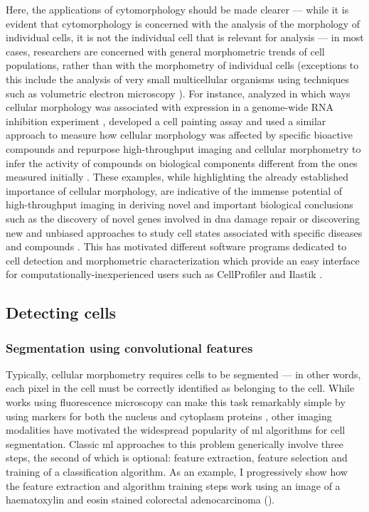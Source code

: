 Here, the applications of cytomorphology should be made clearer --- while it is evident that cytomorphology is concerned with the analysis of the morphology of individual cells, it is not the individual cell that is relevant for analysis --- in most cases, researchers are concerned with general morphometric trends of cell populations, rather than with the morphometry of individual cells (exceptions to this include the analysis of very small multicellular organisms using techniques such as volumetric electron microscopy \cite{Vergara2021-nx,Witvliet2021-gv}). For instance,  analyzed in which ways cellular morphology was associated with expression in a genome-wide RNA inhibition experiment \cite{Fuchs2010-pk},  developed a cell painting assay and used a similar approach to measure how cellular morphology was affected by specific bioactive compounds \cite{Gustafsdottir2013-ul} and  repurpose high-throughput imaging and cellular morphometry to infer the activity of compounds on biological components different from the ones measured initially \cite{Simm2018-nh}. These examples, while highlighting the already established importance of cellular morphology, are indicative of the immense potential of high-throughput imaging in deriving novel and important biological conclusions such as the discovery of novel genes involved in \ac{dna} damage repair \cite{Fuchs2010-pk} or discovering new and unbiased approaches to study cell states associated with specific diseases and compounds \cite{Gustafsdottir2013-ul}. This has motivated different software programs dedicated to cell detection and morphometric characterization which provide an easy interface for computationally-inexperienced users such as CellProfiler \cite{Carpenter2006-hy} and Ilastik \cite{Sommer2011-ds}.

\subsection{Detecting cells}

\subsubsection{Segmentation using convolutional features}

Typically, cellular morphometry requires cells to be segmented --- in other words, each pixel in the cell must be correctly identified as belonging to the cell. While works using fluorescence microscopy can make this task remarkably simple by using markers for both the nucleus and cytoplasm proteins \cite{Fuchs2010-pk,Gustafsdottir2013-ul}, other imaging modalities have motivated the widespread popularity of \ac{ml} algorithms for cell segmentation. Classic \ac{ml} approaches to this problem generically involve three steps, the second of which is optional: feature extraction, feature selection and training of a classification algorithm. As an example, I progressively show how the feature extraction and algorithm training steps work using an image of a haematoxylin and eosin stained colorectal adenocarcinoma \cite{Graham2019-em} ().

